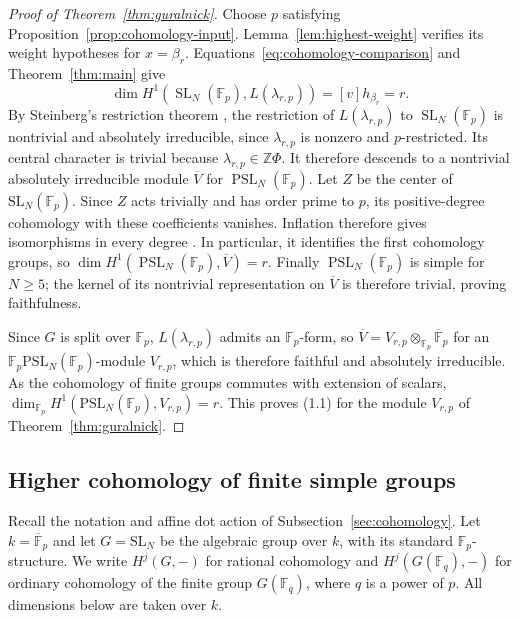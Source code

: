 \documentclass[11pt,a4paper,reqno]{amsart}
\numberwithin{equation}{section}
\theoremstyle{definition}
\theoremstyle{remark}
\theoremstyle{plain}
\begin{document}
\begin{proof}[Proof of Theorem~\ref{thm:guralnick}]
Choose $p$ satisfying Proposition~\ref{prop:cohomology-input}.
Lemma~\ref{lem:highest-weight} verifies its weight hypotheses
for $x=\beta_r$. Equations~\eqref{eq:cohomology-comparison} and
Theorem~\ref{thm:main} give
\[
 \dim H^1(\operatorname{SL}_N(\mathbb F_p),L(\lambda_{r,p} ))
 =[v]h_{\beta_r}=r.
\]
By Steinberg's restriction theorem \cite{Steinberg}, the restriction of
$L(\lambda_{r,p} )$ to $\operatorname{SL}_N(\mathbb F_p)$ is nontrivial and
absolutely irreducible, since $\lambda_{r,p} $ is nonzero and
$p$-restricted.
Its central character is trivial because $\lambda_{r,p} \in\mathbb Z\Phi$.
It therefore descends to a nontrivial absolutely irreducible module
$\overline V$ for $\operatorname{PSL}_N(\mathbb F_p)$.
Let $Z$ be the center of $\mathrm{SL}_N(\mathbb F_p)$.
Since $Z$ acts trivially and has order prime to $p$,
its positive-degree cohomology with these coefficients
vanishes. Inflation therefore gives isomorphisms
in every degree
\cite[Proposition~1.8.11]{Sharifi}.
In particular, it identifies the first cohomology groups,
so $\dim H^1(\operatorname{PSL}_N(\mathbb F_p),\overline V)=r$.
Finally $\operatorname{PSL}_N(\mathbb F_p)$ is simple for $N\geq5$;
the kernel of its nontrivial representation on $\overline V$ is therefore
trivial, proving faithfulness.

Since $G$ is split over $\mathbb F_p$, $L(\lambda_{r,p})$ admits an
$\mathbb F_p$-form, so $\overline V=V_{r,p}\otimes_{\mathbb F_p}\overline{\mathbb F}_p$
for an $\mathbb F_p\mathrm{PSL}_N(\mathbb F_p)$-module $V_{r,p}$, which is
therefore faithful and absolutely irreducible. As the cohomology of finite
groups commutes with extension of scalars,
$\dim_{\mathbb F_p}H^1(\mathrm{PSL}_N(\mathbb F_p),V_{r,p})=r$.
This proves (1.1) for the module $V_{r,p}$ of
Theorem~\ref{thm:guralnick}.
\end{proof}





\subsection{Higher cohomology of finite simple groups}
\label{subsec:higher-cohomology}

Recall the notation and affine dot action of
Subsection~\ref{sec:cohomology}. Let $k=\overline{\mathbb F}_p$
and let $G=\mathrm{SL}_N$ be the algebraic group over $k$,
with its standard $\mathbb F_p$-structure.
We write $H^j(G,-)$ for rational cohomology and
$H^j(G(\mathbb F_q),-)$ for ordinary cohomology of the
finite group $G(\mathbb F_q)$, where $q$ is a power of $p$.
All dimensions below are taken over $k$.
\end{document}
